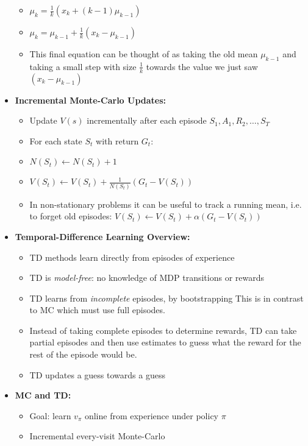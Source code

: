 \documentclass[12pt]{article}
\begin{document}
\begin{itemize}
\begin{itemize}
      \item $\mu_k = \frac{1}{k}(x_k + (k-1)\mu_{k-1})$
      \item $\mu_k = \mu_{k-1} + \frac{1}{k}(x_k - \mu_{k-1})$
      \item This final equation can be thought of as taking the old mean $\mu_{k-1}$ and
      taking a small step with size $\frac{1}{k}$ towards the value we just saw $(x_k - \mu_{k-1})$
    \end{itemize}
    \item \textbf{Incremental Monte-Carlo Updates:}
    \begin{itemize}
      \item Update $V(s)$ incrementally after each episode $S_1, A_1, R_2, \dots, S_T$
      \item For each state $S_t$ with return $G_t$:
      \item $N(S_t) \leftarrow N(S_t) + 1$
      \item $V(S_t) \leftarrow V(S_t) + \frac{1}{N(S_t)}(G_t - V(S_t))$
      \item In non-stationary problems it can be useful to track a running mean,
      i.e. to forget old episodes: $V(S_t) \leftarrow V(S_t) + \alpha(G_t - V(S_t))$
    \end{itemize}
    \item \textbf{Temporal-Difference Learning Overview:}
    \begin{itemize}
      \item TD methods learn directly from episodes of experience
      \item TD is \textit{model-free}: no knowledge of MDP transitions or rewards
      \item TD learns from \textit{incomplete} episodes, by bootstrapping
      This is in contrast to MC which must use full episodes.
      \item Instead of taking complete episodes to determine rewards, TD can take partial
      episodes and then use estimates to guess what the reward for the rest of the episode would be.
      \item TD updates a guess towards a guess
    \end{itemize}
    \item \textbf{MC and TD:}
    \begin{itemize}
      \item Goal: learn $v_\pi$ online from experience under policy $\pi$
      \item Incremental every-visit Monte-Carlo
      \begin{itemize}

\end{itemize}
\end{itemize}
\end{itemize}
\end{document}
